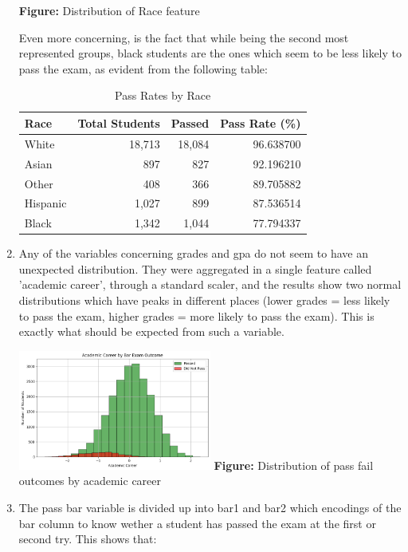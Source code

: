 \documentclass{article}
\begin{document}
\begin{enumerate}
\begin{center}
      \vspace{0.5em}
      \textbf{Figure:} Distribution of Race feature
    \end{center}
    Even more concerning, is the fact that while being the second most represented groups, black students are the ones which seem to be less likely to pass the exam, as evident from the following table:
    \begin{table}[h!]
    \centering
    \caption{Pass Rates by Race}
    \begin{tabular}{lrrr}
    \toprule
    Race & Total Students & Passed & Pass Rate (\%) \\
    \midrule
    White   & 18,713 & 18,084 & 96.638700 \\
    Asian   & 897    & 827    & 92.196210 \\
    Other   & 408    & 366    & 89.705882 \\
    Hispanic & 1,027  & 899    & 87.536514 \\
    Black   & 1,342  & 1,044  & 77.794337 \\
    \bottomrule
    \end{tabular}
    \label{tab:pass_rates_race}
    \end{table}
    \item Any of the variables concerning grades and gpa do not seem to have an unexpected distribution. They were aggregated in a single feature called 'academic career', through a standard scaler, and the results show two normal distributions which have peaks in different places (lower grades = less likely to pass the exam, higher grades = more likely to pass the exam). This is exactly what should be expected from such a variable. 
    \noindent
    \begin{center}
      \includegraphics[width=0.5\textwidth]{academic-career.png}
      \vspace{0.5em}
      \textbf{Figure:} Distribution of pass fail outcomes by academic career
    \end{center}
    \item The pass bar variable is divided up into bar1 and bar2 which encodings of the bar column to know wether a student has passed the exam at the first or second try. This shows that:

\end{enumerate}
\end{document}
